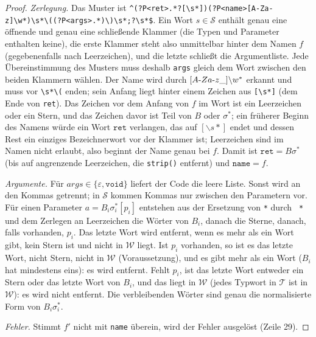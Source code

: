 \documentclass[a4paper,12pt,twoside]{report}
\DeclareRobustCommand{\_}{\ifmmode\mbox{\textunderscore}\else\textunderscore\allowbreak{}\fi}
\theoremstyle{definition}
\begin{document}
\begin{proof}
	\emph{Zerlegung.} Das Muster ist \texttt{\^{}(?P<ret>.*?[\textbackslash s*])(?P<name>[A-Za-z\_]\textbackslash w*)\textbackslash s*\textbackslash((?P<args>.*)\textbackslash)\textbackslash s*;?\textbackslash s*\$}. Ein Wort $s\in\mathcal S$ enthält genau eine öffnende und genau eine schließende Klammer (die Typen und Parameter enthalten keine), die erste Klammer steht also unmittelbar hinter dem Namen $f$ (gegebenenfalls nach Leerzeichen), und die letzte schließt die Argumentliste. Jede Übereinstimmung des Musters muss deshalb \texttt{args} gleich dem Wort zwischen den beiden Klammern wählen. Der Name wird durch $[A\text{-}Za\text{-}z\_]\backslash w^*$ erkannt und muss vor \texttt{\textbackslash s*\textbackslash(} enden; sein Anfang liegt hinter einem Zeichen aus \texttt{[\textbackslash s*]} (dem Ende von \texttt{ret}). Das Zeichen vor dem Anfang von $f$ im Wort ist ein Leerzeichen oder ein Stern, und das Zeichen davor ist Teil von $B$ oder $\sigma^*$; ein früherer Beginn des Namens würde ein Wort $\texttt{ret}$ verlangen, das auf $[\backslash s*]$ endet und dessen Rest ein einziges Bezeichnerwort vor der Klammer ist; Leerzeichen sind im Namen nicht erlaubt, also beginnt der Name genau bei $f$. Damit ist $\texttt{ret}=B\sigma^*$ (bis auf angrenzende Leerzeichen, die \texttt{strip()} entfernt) und $\texttt{name}=f$.

	\emph{Argumente.} Für $\mathit{args}\in\{\varepsilon,\texttt{void}\}$ liefert der Code die leere Liste. Sonst wird an den Kommas getrennt; in $\mathcal S$ kommen Kommas nur zwischen den Parametern vor. Für einen Parameter $a=B_i\sigma_i^*[p_i]$ entstehen aus der Ersetzung von \texttt{*} durch \texttt{ * } und dem Zerlegen an Leerzeichen die Wörter von $B_i$, danach die Sterne, danach, falls vorhanden, $p_i$. Das letzte Wort wird entfernt, wenn es mehr als ein Wort gibt, kein Stern ist und nicht in $\mathcal W$ liegt. Ist $p_i$ vorhanden, so ist es das letzte Wort, nicht Stern, nicht in $\mathcal W$ (Voraussetzung), und es gibt mehr als ein Wort ($B_i$ hat mindestens eins): es wird entfernt. Fehlt $p_i$, ist das letzte Wort entweder ein Stern oder das letzte Wort von $B_i$, und das liegt in $\mathcal W$ (jedes Typwort in $\mathcal T$ ist in $\mathcal W$): es wird nicht entfernt. Die verbleibenden Wörter sind genau die normalisierte Form von $B_i\sigma_i^*$.

	\emph{Fehler.} Stimmt $f'$ nicht mit \texttt{name} überein, wird der Fehler ausgelöst (Zeile 29).
\end{proof}
\end{document}

